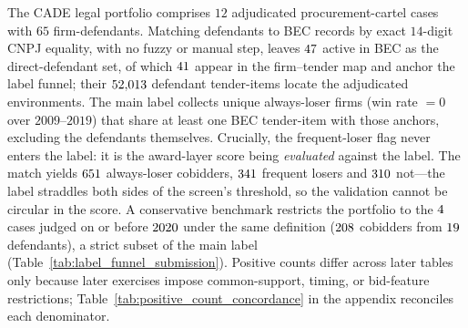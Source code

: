 The CADE legal portfolio comprises $12$ adjudicated
procurement-cartel cases with $65$ firm-defendants. Matching
defendants to BEC records by exact $14$-digit CNPJ equality, with
no fuzzy or manual step, leaves $47$ active in BEC as
the direct-defendant set, of which $41$
appear in the firm--tender map and anchor the label funnel; their
$52{,}013$ defendant tender-items locate the adjudicated
environments. The main label collects unique always-loser firms
(win rate $=0$ over $2009$--$2019$) that share at least one BEC
tender-item with those anchors, excluding the defendants
themselves. Crucially, the frequent-loser flag never enters the
label: it is the award-layer score being \emph{evaluated} against
the label. The match yields $651$ always-loser
cobidders, $341$ frequent losers and $310$
not---the label straddles both sides of the screen's threshold, so
the validation cannot be circular in the score. A conservative
benchmark restricts the portfolio to the $4$
cases judged on or before $2020$ under the same
definition ($208$ cobidders from
$19$ defendants), a strict subset of the main label
(Table~\ref{tab:label_funnel_submission}). Positive counts differ
across later tables only because later exercises impose
common-support, timing, or bid-feature restrictions;
Table~\ref{tab:positive_count_concordance} in the appendix
reconciles each denominator.

